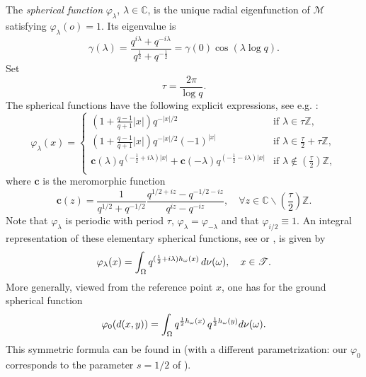 \documentclass[11pt,a4paper,reqno]{amsart}
\renewcommand\mathcal{\mathscr}
\theoremstyle{plain}
\theoremstyle{remark}
\theoremstyle{definition}
\theoremstyle{remark}
\numberwithin{equation}{section}
\def\int{\intop\nolimits}
\begin{document}
    The \textit{spherical function} $\varphi_\lambda$, $\lambda\in\mathbb C$, is
the unique radial eigenfunction of $\mathcal M$ satisfying
$\varphi_\lambda(o)=1$. Its eigenvalue is
	\begin{equation}\label{gammalambda0}
		\gamma(\lambda)=\frac{q^{i\lambda}+q^{-i\lambda}}{q^{\frac{1}{2}}+q^{-\frac{1}{2}}}=\gamma(0)\cos(\lambda \log q).
	\end{equation}
    Set 
	$$\tau=\frac{2\pi}{\log q}.$$ 
	 The spherical functions have the following explicit expressions, see e.g. \cite[p.1273]{CMS}:
	\begin{equation} \label{eq:sphericalT}
		\varphi_\lambda(x)=
		\begin{cases}
			\left( 1+\frac{q-1}{q+1}|x| \right)q^{-|x|/2} & \text{if } \lambda \in \tau\mathbb{Z},\\
			\left( 1+\frac{q-1}{q+1}|x| \right)q^{-|x|/2}(-1)^{|x|} & \text{if } \lambda \in \frac{\tau}{2}+\tau\mathbb{Z},\\
			\textbf{c}(\lambda)q^{( -\frac{1}{2}+i\lambda)|x|}+\textbf{c}(-\lambda)q^{( -\frac{1}{2}-i\lambda)|x|} & \text{if } \lambda \notin (\frac{\tau}{2})\mathbb{Z}, \\
		\end{cases}
	\end{equation}
	where $\textbf{c}$ is the meromorphic function
	\begin{equation} \label{cfunc}
		\textbf{c}(z)=\frac{1}{q^{1/2}+q^{-1/2}} \frac{q^{1/2+iz}-q^{-1/2-iz}}{q^{iz}-q^{-iz}}, \quad \forall z \in \mathbb{C} \backslash (\frac{\tau}{2})\mathbb{Z}.
	\end{equation}
	Note that $\varphi_\lambda$ is periodic with period $\tau$, $\varphi_{\lambda}=\varphi_{-\lambda}$ and that $\varphi_{i/2}\equiv 1$. An integral representation of these elementary spherical functions, see \cite[p.400]{CMS0} or \cite[Theorem 2.1]{Figa}, is given by 
\begin{equation}\label{eq:integralrepspherical}
		\varphi_{\lambda}(x)=\int_{\Omega} {q^{(\frac{1}{2}+i\lambda)h_\omega(x)} }\,d\nu(\omega), \quad x\in \mathcal{T}.
	\end{equation}
	More generally, viewed from the reference point $x$, one has for the ground spherical function
\begin{equation}\label{eq:integralrepspherical0}
\varphi_0(d(x,y))=
		\int_\Omega q^{\frac{1}{2}h_{\omega}(x)}\,
		 q^{\frac{1}{2}h_{\omega}(y)}   d\nu( \omega).
\end{equation} 
This symmetric formula can be found in \cite[p.55]{Figa} (with a different parametrization: our $\varphi_0$ corresponds to the parameter $s=1/2$ of \cite{Figa}).
\end{document}
